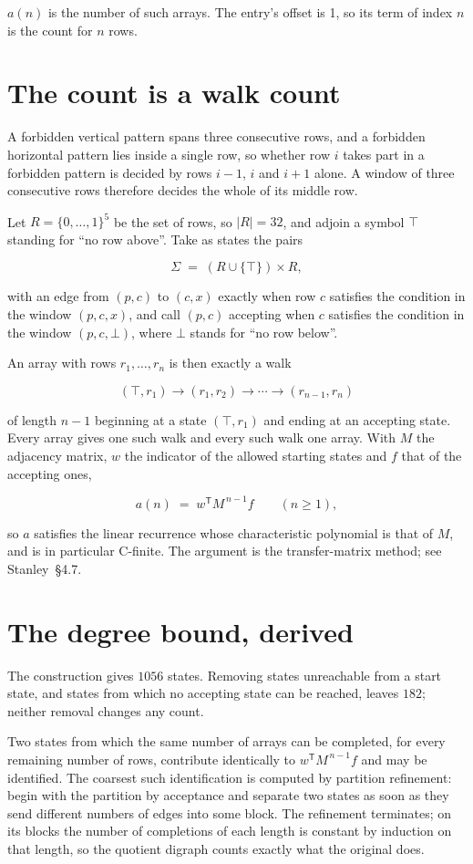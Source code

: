 \documentclass[11pt]{article}
\theoremstyle{definition}
\begin{document}
$a(n)$ is the number of such arrays. The entry's offset is 1, so its term of index $n$ is the count for $n$ rows.

\section{The count is a walk count}

A forbidden vertical pattern spans three consecutive rows, and a forbidden horizontal pattern lies inside a single row, so whether row $i$ takes part in a forbidden pattern is decided by rows $i-1$, $i$ and $i+1$ alone. A window of three consecutive rows therefore decides the whole of its middle row.

Let $R = \{0,\dots,1\}^{5}$ be the set of rows, so $|R| = 32$, and adjoin a symbol $\top$ standing for ``no row above''. Take as states the pairs

\[\Sigma \;=\; (R \cup \{\top\}) \times R,\]

with an edge from $(p,c)$ to $(c,x)$ exactly when row $c$ satisfies the condition in the window $(p,c,x)$, and call $(p,c)$ accepting when $c$ satisfies the condition in the window $(p,c,\bot)$, where $\bot$ stands for ``no row below''.

An array with rows $r_1,\dots,r_n$ is then exactly a walk

\[(\top,r_1) \to (r_1,r_2) \to \cdots \to (r_{n-1},r_n)\]

of length $n-1$ beginning at a state $(\top,r_1)$ and ending at an accepting state. Every array gives one such walk and every such walk one array. With $M$ the adjacency matrix, $w$ the indicator of the allowed starting states and $f$ that of the accepting ones,

\[a(n) \;=\; w^{\mathsf T} M^{\,n-1} f \qquad (n \ge 1),\]

so $a$ satisfies the linear recurrence whose characteristic polynomial is that of $M$, and is in particular C-finite. The argument is the transfer-matrix method; see Stanley~\S4.7.

\section{The degree bound, derived}

The construction gives $1056$ states. Removing states unreachable from a start state, and states from which no accepting state can be reached, leaves $182$; neither removal changes any count.

Two states from which the same number of arrays can be completed, for every remaining number of rows, contribute identically to $w^{\mathsf T}M^{\,n-1}f$ and may be identified. The coarsest such identification is computed by partition refinement: begin with the partition by acceptance and separate two states as soon as they send different numbers of edges into some block. The refinement terminates; on its blocks the number of completions of each length is constant by induction on that length, so the quotient digraph counts exactly what the original does.
\end{document}
